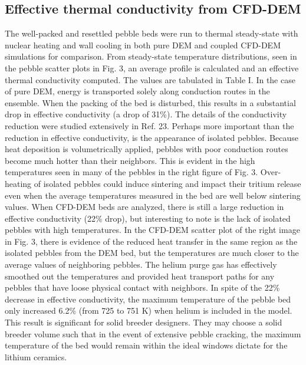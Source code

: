 \subsection{Effective thermal conductivity from CFD-DEM}

The well-packed and resettled pebble beds were run to thermal steady-state with nuclear heating and wall cooling in both pure DEM and coupled CFD-DEM simulations for comparison. From steady-state temperature distributions, seen in the pebble scatter plots in Fig. 3, an average profile is calculated and an effective thermal conductivity computed. The values are tabulated in Table I. 
In the case of pure DEM, energy is transported solely along conduction routes in the ensemble. When the packing of the bed is disturbed, this results in a substantial drop in effective conductivity (a drop of 31\%). The details of the conductivity reduction were studied extensively in Ref. 23. Perhaps more important than the reduction in effective conductivity, is the appearance of isolated pebbles. Because heat deposition is volumetrically applied, pebbles with poor conduction routes become much hotter than their neighbors. This is evident in the high temperatures seen in many of the pebbles in the right figure of Fig. 3. Over-heating of isolated pebbles could induce sintering and impact their tritium release even when the average temperatures measured in the bed are well below sintering values.
When CFD-DEM beds are analyzed, there is still a large reduction in effective conductivity (22\% drop), but interesting to note is the lack of isolated pebbles with high temperatures. In the CFD-DEM scatter plot of the right image in Fig. 3, there is evidence of the reduced heat transfer in the same region as the isolated pebbles from the DEM bed, but the temperatures are much closer to the average values of neighboring pebbles. The helium purge gas has effectively smoothed out the temperatures and provided heat transport paths for any pebbles that have loose physical contact with neighbors.
In spite of the 22\% decrease in effective conductivity, the maximum temperature of the pebble bed only increased 6.2\% (from 725 to 751 K) when helium is included in the model. This result is significant for solid breeder designers. They may choose a solid breeder volume such that in the event of extensive pebble cracking, the maximum temperature of the bed would remain within the ideal windows dictate for the lithium ceramics.

